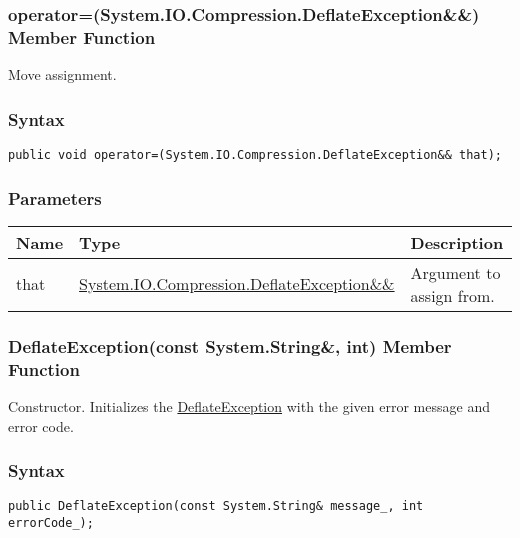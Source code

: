\documentclass[a4paper,oneside,11.000000pt]{book}
\begin{document}
\hypertarget{System.IO.Compression.DeflateException.operator.assign.P.System.IO.Compression.DeflateException.RR.System.IO.Compression.DeflateException}{\subsubsection*{operator=(System.IO.Compression.DeflateException\&\&) Member Function}}\begin{flushleft}
Move assignment.

\end{flushleft}
\subsubsection*{Syntax}
\texttt{public void operator=(System.IO.Compression.DeflateException\&\& that);}
\subsubsection*{Parameters}
\begin{flushleft}
\begin{supertabular}[l]{!{\raggedright}p{1.30721cm}!{\raggedright}p{8.55945cm}!{\raggedright}p{4.93333cm}}
\textbf{Name}
& \textbf{Type}
& \textbf{Description}
\\
\hline
that
& \hyperlink{System.IO.Compression.DeflateException}{System.\-IO.\-Compression.\-DeflateException\&\-\&\-}
& Argument to assign from.

\\
\end{supertabular}

\end{flushleft}
\clearpage

\hypertarget{System.IO.Compression.DeflateException.constructor.P.System.IO.Compression.DeflateException.C.R.System.String.int}{\subsubsection*{DeflateException(const System.String\&, int) Member Function}}
\begin{flushleft}
Constructor. Initializes the \hyperlink{System.IO.Compression.DeflateException}{DeflateException} with the given error message and error code.

\end{flushleft}
\subsubsection*{Syntax}
\texttt{public DeflateException(const System.String\& message\_, int errorCode\_);}
\end{document}

